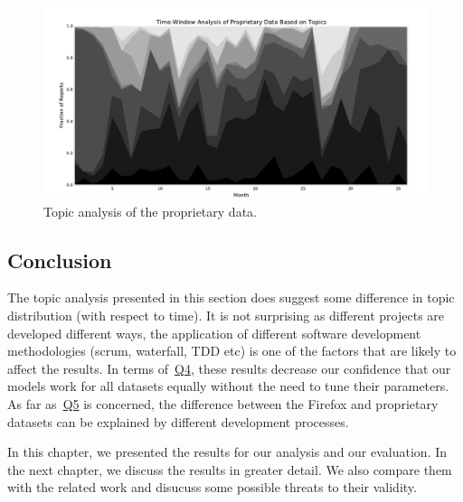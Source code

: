 \begin{figure}[htbp]
    \centering
        \includegraphics[width=\textwidth]{./images/topic_component_distribution/proprietary_topic_10.pdf}
    \caption{Topic analysis of the proprietary data.}
    \label{fig:distribution.prop.topic}
\end{figure}

\subsection{Conclusion}

The topic analysis presented in this section does suggest some difference in topic distribution (with respect to time). It is not surprising as different projects are developed different ways, the application of different software development methodologies (scrum, waterfall, TDD etc) is one of the factors that are likely to affect the results. In terms of~\hyperlink{question:4}{Q4}, these results decrease our confidence that our models work for all datasets equally without the need to tune their parameters. As far as~\hyperlink{question:5}{Q5} is concerned, the difference between the Firefox and proprietary datasets can be explained by different development processes.

In this chapter, we presented the results for our analysis and our evaluation. In the next chapter, we discuss the results in greater detail. We also compare them with the related work and disucuss some possible threats to their validity. 
